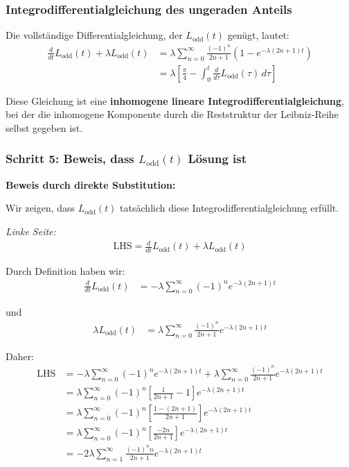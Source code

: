 \documentclass[a4paper, 12pt, twoside, openright]{report}
\theoremstyle{definition}
\theoremstyle{definition}
\begin{document}
\subsubsection*{Integrodifferentialgleichung des ungeraden Anteils}

Die vollständige Differentialgleichung, der $L_{\text{odd}}(t)$ genügt, lautet:
\begin{align}
	\frac{d}{dt} L_{\text{odd}}(t) + \lambda L_{\text{odd}}(t) &= \lambda \sum_{n=0}^{\infty} \frac{(-1)^n}{2n+1} \left( 1 - e^{-\lambda(2n+1)t} \right) \\
	&= \lambda \left[ \frac{\pi}{4} - \int_0^t \frac{d}{d\tau} L_{\text{odd}}(\tau) \, d\tau \right]
\end{align}

Diese Gleichung ist eine \textbf{inhomogene lineare Integrodifferentialgleichung}, bei der die inhomogene Komponente durch die Reststruktur der Leibniz-Reihe selbst gegeben ist.

\subsubsection*{Schritt 5: Beweis, dass $L_{\text{odd}}(t)$ Lösung ist}

\textbf{Beweis durch direkte Substitution:}

Wir zeigen, dass $L_{\text{odd}}(t)$ tatsächlich diese Integrodifferentialgleichung erfüllt.

\textit{Linke Seite:}
\begin{align}
	\text{LHS} = \frac{d}{dt} L_{\text{odd}}(t) + \lambda L_{\text{odd}}(t)
\end{align}

Durch Definition haben wir:
\begin{align}
	\frac{d}{dt} L_{\text{odd}}(t) &= -\lambda \sum_{n=0}^{\infty} (-1)^n e^{-\lambda(2n+1)t}
\end{align}

und
\begin{align}
	\lambda L_{\text{odd}}(t) &= \lambda \sum_{n=0}^{\infty} \frac{(-1)^n}{2n+1} e^{-\lambda(2n+1)t}
\end{align}

Daher:
\begin{align}
	\text{LHS} &= -\lambda \sum_{n=0}^{\infty} (-1)^n e^{-\lambda(2n+1)t} + \lambda \sum_{n=0}^{\infty} \frac{(-1)^n}{2n+1} e^{-\lambda(2n+1)t} \\
	&= \lambda \sum_{n=0}^{\infty} (-1)^n \left[ \frac{1}{2n+1} - 1 \right] e^{-\lambda(2n+1)t} \\
	&= \lambda \sum_{n=0}^{\infty} (-1)^n \left[ \frac{1 - (2n+1)}{2n+1} \right] e^{-\lambda(2n+1)t} \\
	&= \lambda \sum_{n=0}^{\infty} (-1)^n \left[ \frac{-2n}{2n+1} \right] e^{-\lambda(2n+1)t} \\
	&= -2\lambda \sum_{n=1}^{\infty} \frac{(-1)^n n}{2n+1} e^{-\lambda(2n+1)t}
\end{align}
\end{document}
